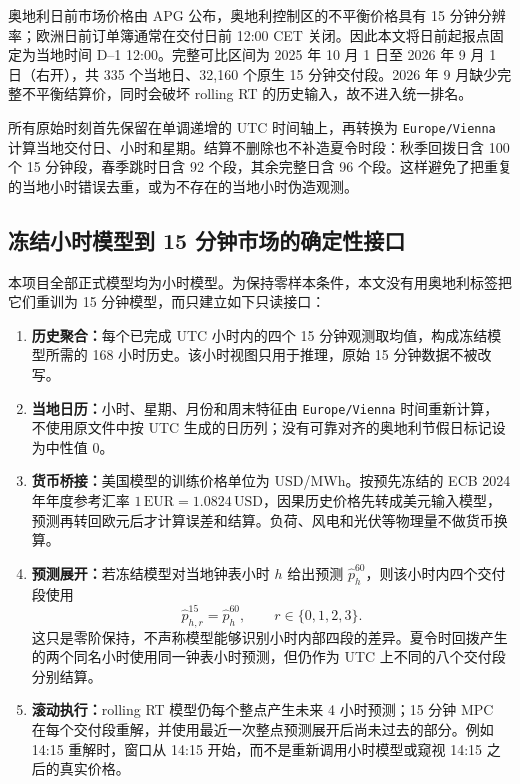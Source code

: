 \documentclass[UTF8,a4paper,11pt,fontset=fandol]{ctexart}
\begin{document}
奥地利日前市场价格由 APG 公布，奥地利控制区的不平衡价格具有 15 分钟分辨率\cite{apgda,apgmarket}；欧洲日前订单簿通常在交付日前 12:00 CET 关闭\cite{epexmarket}。因此本文将日前起报点固定为当地时间 D--1 12:00。完整可比区间为 2025 年 10 月 1 日至 2026 年 9 月 1 日（右开），共 335 个当地日、32,160 个原生 15 分钟交付段。2026 年 9 月缺少完整不平衡结算价，同时会破坏 rolling RT 的历史输入，故不进入统一排名。

所有原始时刻首先保留在单调递增的 UTC 时间轴上，再转换为 \texttt{Europe/Vienna} 计算当地交付日、小时和星期。结算不删除也不补造夏令时段：秋季回拨日含 100 个 15 分钟段，春季跳时日含 92 个段，其余完整日含 96 个段。这样避免了把重复的当地小时错误去重，或为不存在的当地小时伪造观测。

\subsection{冻结小时模型到 15 分钟市场的确定性接口}

本项目全部正式模型均为小时模型。为保持零样本条件，本文没有用奥地利标签把它们重训为 15 分钟模型，而只建立如下只读接口：
\begin{enumerate}
  \item \textbf{历史聚合：}每个已完成 UTC 小时内的四个 15 分钟观测取均值，构成冻结模型所需的 168 小时历史。该小时视图只用于推理，原始 15 分钟数据不被改写。
  \item \textbf{当地日历：}小时、星期、月份和周末特征由 \texttt{Europe/Vienna} 时间重新计算，不使用原文件中按 UTC 生成的日历列；没有可靠对齐的奥地利节假日标记设为中性值 0。
  \item \textbf{货币桥接：}美国模型的训练价格单位为 USD/MWh。按预先冻结的 ECB 2024 年年度参考汇率 $1\,\mathrm{EUR}=1.0824\,\mathrm{USD}$，因果历史价格先转成美元输入模型，预测再转回欧元后才计算误差和结算\cite{ecbfx}。负荷、风电和光伏等物理量不做货币换算。
  \item \textbf{预测展开：}若冻结模型对当地钟表小时 $h$ 给出预测 $\hat p_h^{60}$，则该小时内四个交付段使用
  \begin{equation}
    \hat p_{h,r}^{15}=\hat p_h^{60},\qquad r\in\{0,1,2,3\}.
    \label{eq:quarter-expand}
  \end{equation}
  这只是零阶保持，不声称模型能够识别小时内部四段的差异。夏令时回拨产生的两个同名小时使用同一钟表小时预测，但仍作为 UTC 上不同的八个交付段分别结算。
  \item \textbf{滚动执行：}rolling RT 模型仍每个整点产生未来 4 小时预测；15 分钟 MPC 在每个交付段重解，并使用最近一次整点预测展开后尚未过去的部分。例如 14:15 重解时，窗口从 14:15 开始，而不是重新调用小时模型或窥视 14:15 之后的真实价格。
\end{enumerate}
\end{document}
